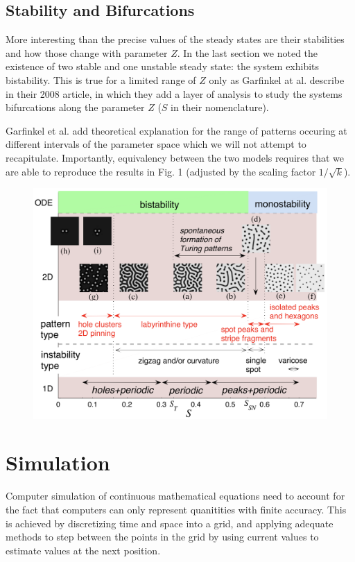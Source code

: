 \documentclass[12pt]{article}
\begin{document}
  \subsection{Stability and Bifurcations}

More interesting than the precise values of the steady states are their stabilities and how those change with parameter $Z$. In the last section we noted the existence of two stable and one unstable steady state: the system exhibits bistability. This is true for a limited range of $Z$ only as Garfinkel at al. describe in their 2008 article, in which they add a layer of analysis to study the systems bifurcations along the parameter $Z$ ($S$ in their nomenclature).

Garfinkel et al. add theoretical explanation for the range of patterns occuring at different intervals of the parameter space which we will not attempt to recapitulate. Importantly, equivalency between the two models requires that we are able to reproduce the results in Fig. 1 (adjusted by the scaling factor $1/\sqrt{k}$).

\begin{figure}[H]
\centering
  \includegraphics[width=0.7 \linewidth]{parameter_space.png}
  \caption{}
  \label{fig:s}
\end{figure}
  
 \section{Simulation}
Computer simulation of continuous mathematical equations need to account for the fact that computers can only represent quanitities with finite accuracy. This is achieved by discretizing time and space into a grid, and applying adequate methods to step between the points in the grid by using current values to estimate values at the next position.
\end{document}

